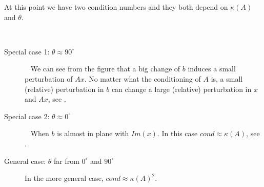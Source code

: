 \documentclass[computationalMathematics.tex]{subfiles}
\begin{document}
At this point we have two condition numbers and they both depend on $\kappa(A)$ and $\theta$.

\begin{obs}~%
  \begin{description}
    \item[{\sc Special case 1: $\theta \approx 90^\circ$}]~%
      We can see from the figure that a big change of $b$ induces a small perturbation of $Ax$. No matter what the conditioning of $A$ is, a small (relative) perturbation in $b$ can change a large (relative) perturbation in $x$ and $Ax$, see .
    \item[{\sc Special case 2: $\theta \approx 0^\circ$}]~%
      When $b$ is almost in plane with $Im(x)$. In this case $cond \approx \kappa(A)$, see .
    \item[{\sc General case: $\theta$ far from $0^\circ$ and $90^\circ$}]
      In the more general case, $cond \approx \kappa(A)^2$.
  \end{description}
\end{obs}
\end{document}

